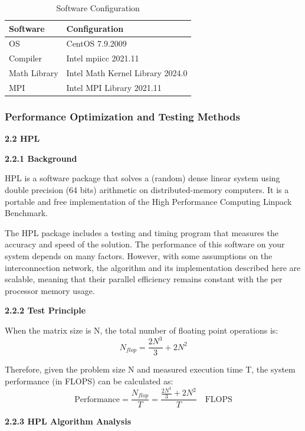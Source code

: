 \documentclass[a4paper,12pt]{article}
\begin{document}
\begin{table}[H]
\centering
\vspace{0.5cm}
\begin{tabular}{ll}
\toprule
Software & Configuration \\
\midrule
OS & CentOS 7.9.2009 \\
Compiler & Intel mpiicc 2021.11 \\
Math Library & Intel Math Kernel Library 2024.0 \\
MPI & Intel MPI Library 2021.11 \\
\bottomrule
\end{tabular}
\caption{Software Configuration}
\end{table}


\subsubsection{Performance Optimization and Testing Methods}

\textbf{2.2 HPL}

\textbf{2.2.1 Background}

HPL is a software package that solves a (random) dense linear system using double precision (64 bits) arithmetic on distributed-memory computers. It is a portable and free implementation of the High Performance Computing Linpack Benchmark.

The HPL package includes a testing and timing program that measures the accuracy and speed of the solution. The performance of this software on your system depends on many factors. However, with some assumptions on the interconnection network, the algorithm and its implementation described here are scalable, meaning that their parallel efficiency remains constant with the per processor memory usage.

\textbf{2.2.2 Test Principle}

When the matrix size is N, the total number of floating point operations is:
\begin{equation}
    \boxed{N_{flop} = \frac{2N^3}{3} + 2N^2}
\end{equation}

Therefore, given the problem size N and measured execution time T, the system performance (in FLOPS) can be calculated as:
\begin{equation}
    \text{Performance} = \frac{N_{flop}}{T} = \frac{\frac{2N^3}{3} + 2N^2}{T} \quad \text{FLOPS}
\end{equation}

\textbf{2.2.3 HPL Algorithm Analysis}
\end{document}
